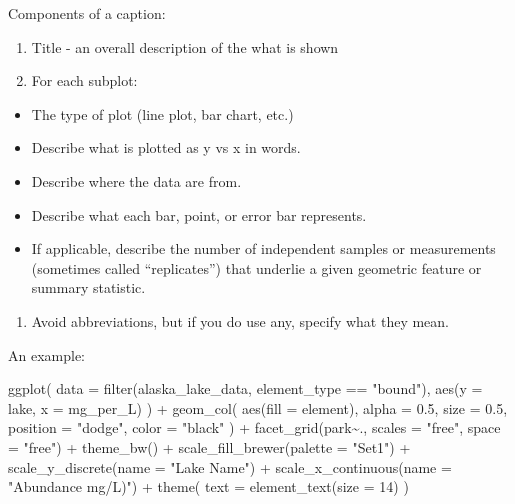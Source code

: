\documentclass[
]{krantz}
\newenvironment{Shaded}{\begin{snugshade}}{\end{snugshade}}
\newcommand{\AttributeTok}[1]{\textcolor[rgb]{0.77,0.63,0.00}{#1}}
\newcommand{\DecValTok}[1]{\textcolor[rgb]{0.00,0.00,0.81}{#1}}
\newcommand{\FloatTok}[1]{\textcolor[rgb]{0.00,0.00,0.81}{#1}}
\newcommand{\FunctionTok}[1]{\textcolor[rgb]{0.00,0.00,0.00}{#1}}
\newcommand{\NormalTok}[1]{#1}
\newcommand{\SpecialCharTok}[1]{\textcolor[rgb]{0.00,0.00,0.00}{#1}}
\newcommand{\StringTok}[1]{\textcolor[rgb]{0.31,0.60,0.02}{#1}}
\providecommand{\tightlist}{%
  \setlength{\itemsep}{0pt}\setlength{\parskip}{0pt}}
\begin{document}
Components of a caption:

\begin{enumerate}
\def\labelenumi{\arabic{enumi}.}
\tightlist
\item
  Title - an overall description of the what is shown
\item
  For each subplot:
\end{enumerate}

\begin{itemize}
\tightlist
\item
  The type of plot (line plot, bar chart, etc.)
\item
  Describe what is plotted as y vs x in words.
\item
  Describe where the data are from.
\item
  Describe what each bar, point, or error bar represents.
\item
  If applicable, describe the number of independent samples or measurements (sometimes called ``replicates'') that underlie a given geometric feature or summary statistic.
\end{itemize}

\begin{enumerate}
\def\labelenumi{\arabic{enumi}.}
\setcounter{enumi}{2}
\tightlist
\item
  Avoid abbreviations, but if you do use any, specify what they mean.
\end{enumerate}

An example:

\begin{Shaded}
\begin{Highlighting}[]
\FunctionTok{ggplot}\NormalTok{(}
  \AttributeTok{data =} \FunctionTok{filter}\NormalTok{(alaska\_lake\_data, element\_type }\SpecialCharTok{==} \StringTok{"bound"}\NormalTok{),}
  \FunctionTok{aes}\NormalTok{(}\AttributeTok{y =}\NormalTok{ lake, }\AttributeTok{x =}\NormalTok{ mg\_per\_L)}
\NormalTok{) }\SpecialCharTok{+}
  \FunctionTok{geom\_col}\NormalTok{(}
    \FunctionTok{aes}\NormalTok{(}\AttributeTok{fill =}\NormalTok{ element),}
    \AttributeTok{alpha =} \FloatTok{0.5}\NormalTok{, }\AttributeTok{size =} \FloatTok{0.5}\NormalTok{, }\AttributeTok{position =} \StringTok{"dodge"}\NormalTok{,}
    \AttributeTok{color =} \StringTok{"black"}
\NormalTok{  ) }\SpecialCharTok{+}
  \FunctionTok{facet\_grid}\NormalTok{(park}\SpecialCharTok{\textasciitilde{}}\NormalTok{., }\AttributeTok{scales =} \StringTok{"free"}\NormalTok{, }\AttributeTok{space =} \StringTok{"free"}\NormalTok{) }\SpecialCharTok{+}
  \FunctionTok{theme\_bw}\NormalTok{() }\SpecialCharTok{+}
  \FunctionTok{scale\_fill\_brewer}\NormalTok{(}\AttributeTok{palette =} \StringTok{"Set1"}\NormalTok{) }\SpecialCharTok{+}
  \FunctionTok{scale\_y\_discrete}\NormalTok{(}\AttributeTok{name =} \StringTok{"Lake Name"}\NormalTok{) }\SpecialCharTok{+}
  \FunctionTok{scale\_x\_continuous}\NormalTok{(}\AttributeTok{name =} \StringTok{"Abundance mg/L)"}\NormalTok{) }\SpecialCharTok{+}
  \FunctionTok{theme}\NormalTok{(}
    \AttributeTok{text =} \FunctionTok{element\_text}\NormalTok{(}\AttributeTok{size =} \DecValTok{14}\NormalTok{)}
\NormalTok{  )}
\end{Highlighting}
\end{Shaded}
\end{document}
